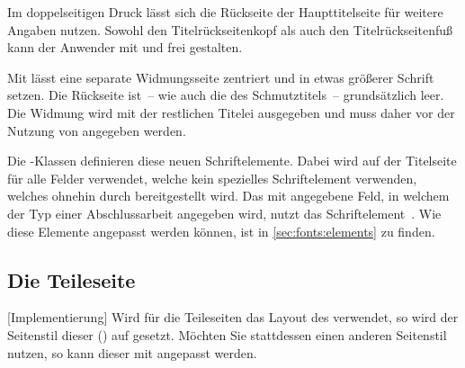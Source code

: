 \begin{Declaration}{}
\begin{Declaration}{}
\begin{Declaration}{}
\begin{Declaration}{}
\begin{Declaration}{}
\begin{Declaration}{}
\begin{Declaration}{}
\begin{Declaration}{}
\begin{Declaration}{}
%
Im doppelseitigen Druck lässt sich die Rückseite der Haupttitelseite für 
weitere Angaben nutzen. Sowohl den Titelrückseitenkopf als auch den
Titelrückseitenfuß kann der Anwender mit  und 
 frei gestalten.

Mit  lässt eine separate Widmungsseite zentriert und in etwas 
größerer Schrift setzen. Die Rückseite ist~-- wie auch die des Schmutztitels~-- 
grundsätzlich leer. Die Widmung wird mit der restlichen Titelei ausgegeben und 
muss daher vor der Nutzung von  angegeben werden.
\end{Declaration}
\end{Declaration}
\end{Declaration}
\end{Declaration}
\end{Declaration}
\end{Declaration}
\end{Declaration}
\end{Declaration}
\end{Declaration}

\begin{Declaration}[v2.02]{}
\begin{Declaration}[v2.02]{}
\printdeclarationlist%
%
Die \TUDScript-Klassen definieren diese neuen Schriftelemente. Dabei wird 
 auf der Titelseite für alle Felder verwendet, welche kein 
spezielles Schriftelement verwenden, welches ohnehin durch \KOMAScript{} 
bereitgestellt wird. Das mit  angegebene Feld, in welchem der Typ 
einer Abschlussarbeit angegeben wird, nutzt das Schriftelement~. 
Wie diese Elemente angepasst werden können, ist in \autoref{sec:fonts:elements} 
zu finden. 
\end{Declaration}
\end{Declaration}


\subsection{Die Teileseite}
\label{sec:part}
%
[Implementierung]
Wird für die Teileseiten das Layout des \CDs verwendet, so wird der Seitenstil 
dieser () auf  gesetzt. 
Möchten Sie stattdessen einen anderen Seitenstil nutzen, so kann dieser mit 
angepasst werden.

